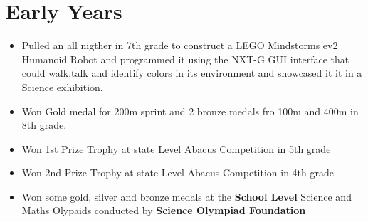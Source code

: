 \documentclass[a4paper,12pt]{article}
\begin{document}
\section*{Early Years}
\begin{itemize}
    \item Pulled an all nigther in 7th grade to construct a LEGO Mindstorms ev2 
    Humanoid Robot and programmed it using the NXT-G GUI interface that could walk,talk 
    and identify colors in its environment and showcased it it in a Science exhibition.
    \item Won Gold medal for 200m sprint and 2 bronze medals fro 100m and 400m in 8th grade.
    \item Won 1st Prize Trophy at state Level Abacus Competition in 5th grade
    \item Won 2nd Prize Trophy at state Level Abacus Competition in 4th grade     
    \item Won some gold, silver and bronze medals at the \textbf{School Level}  Science 
    and Maths Olypaids conducted by \textbf{Science Olympiad Foundation}            
\end{itemize}


\end{document}
